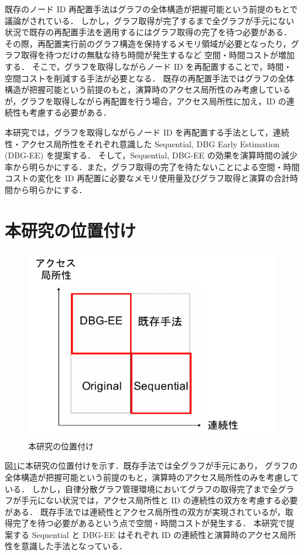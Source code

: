 既存のノード ID 再配置手法はグラフの全体構造が把握可能という前提のもとで議論がされている．
しかし，グラフ取得が完了するまで全グラフが手元にない状況で既存の再配置手法を適用するにはグラフ取得の完了を待つ必要がある．
その際，再配置実行前のグラフ構造を保持するメモリ領域が必要となったり，グラフ取得を待つだけの無駄な待ち時間が発生するなど
空間・時間コストが増加する．
そこで，グラフを取得しながらノード ID を再配置することで，時間・空間コストを削減する手法が必要となる．
既存の再配置手法ではグラフの全体構造が把握可能という前提のもと，演算時のアクセス局所性のみ考慮しているが，グラフを取得しながら再配置を行う場合，アクセス局所性に加え，ID の連続性も考慮する必要がある．

本研究では，グラフを取得しながらノード ID を再配置する手法として，連続性・アクセス局所性をそれぞれ意識した Sequential, DBG Early Estimation (DBG-EE) を提案する．
そして，Sequential, DBG-EE の効果を演算時間の減少率から明らかにする．また，グラフ取得の完了を待たないことによる空間・時間コストの変化を 
ID 再配置に必要なメモリ使用量及びグラフ取得と演算の合計時間から明らかにする．

\section{本研究の位置付け}
\begin{figure}[t]
  \centering
  \includegraphics[width=\linewidth]{./figure/research_position.pdf}
  \caption{本研究の位置付け}
  \label{research_position}
\end{figure}
図\ref{research_position}に本研究の位置付けを示す．既存手法では全グラフが手元にあり，
グラフの全体構造が把握可能という前提のもと，演算時のアクセス局所性のみを考慮している．
しかし，自律分散グラフ管理環境においてグラフの取得完了まで全グラフが手元にない状況では，アクセス局所性と ID の連続性の双方を考慮する必要がある．
既存手法では連続性とアクセス局所性の双方が実現されているが，取得完了を待つ必要があるという点で空間・時間コストが発生する．
本研究で提案する Sequential と DBG-EE はそれぞれ ID の連続性と演算時のアクセス局所性を意識した手法となっている．

